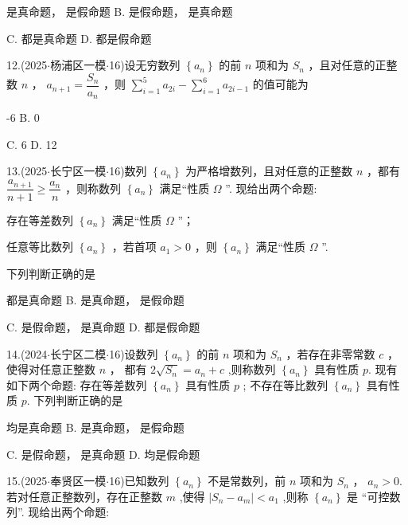\xx{}{}{}{}  是真命题，  是假命题 B.   是假命题，  是真命题

C.     都是真命题 D.     都是假命题

12.(2025$\cdot$杨浦区一模$\cdot$16)设无穷数列 $\left\{  {a}_{n}\right\}$ 的前 $n$ 项和为 ${S}_{n}$ ，且对任意的正整数 $n$ ， ${a}_{n + 1} = \dfrac{{S}_{n}}{{a}_{n}}$ ，则 $\mathop{\sum }\limits_{{i = 1}}^{5}{a}_{2i} - \mathop{\sum }\limits_{{i = 1}}^{6}{a}_{{2i} - 1}$ 的值可能为 \dotfill{(\kh{})}

\xx{}{}{}{}-6 B. 0

C. 6 D. 12

13.(2025$\cdot$长宁区一模$\cdot$16)数列 $\left\{  {a}_{n}\right\}$ 为严格增数列，且对任意的正整数 $n$ ，都有 $\dfrac{{a}_{n + 1}}{n + 1} \geq  \dfrac{{a}_{n}}{n}$ ，则称数列 $\left\{  {a}_{n}\right\}$ 满足“性质 $\Omega$ ”. 现给出两个命题:

   存在等差数列 $\left\{  {a}_{n}\right\}$ 满足“性质 $\Omega$ ”；

   任意等比数列 $\left\{  {a}_{n}\right\}$ ，若首项 ${a}_{1} > 0$ ，则 $\left\{  {a}_{n}\right\}$ 满足“性质 $\Omega$ ”.

下列判断正确的是 \dotfill{(\kh{})}

\xx{}{}{}{}    都是真命题 B.   是真命题，  是假命题

C.   是假命题，  是真命题 D.     都是假命题

14.(2024$\cdot$长宁区二模$\cdot$16)设数列 $\left\{  {a}_{n}\right\}$ 的前 $n$ 项和为 ${S}_{n}$ ，若存在非零常数 $c$ ，使得对任意正整数 $n$ ， 都有 $2\sqrt{{S}_{n}} = {a}_{n} + c$ ,则称数列 $\left\{  {a}_{n}\right\}$ 具有性质 $p$. 现有如下两个命题:   存在等差数列 $\left\{  {a}_{n}\right\}$ 具有性质 $p$ ;    不存在等比数列 $\left\{  {a}_{n}\right\}$ 具有性质 $p$. 下列判断正确的是 \dotfill{(\kh{})}

\xx{}{}{}{}    均是真命题 B.   是真命题，  是假命题

C.   是假命题，  是真命题 D.     均是假命题

15.(2025$\cdot$奉贤区一模$\cdot$16)已知数列 $\left\{  {a}_{n}\right\}$ 不是常数列，前 $n$ 项和为 ${S}_{n}$ ， ${a}_{n} > 0$. 若对任意正整数列，存在正整数 $m$ ,使得 $\left| {{S}_{n} - {a}_{m}}\right|  < {a}_{1}$ ,则称 $\left\{  {a}_{n}\right\}$ 是 “可控数列”. 现给出两个命题:

